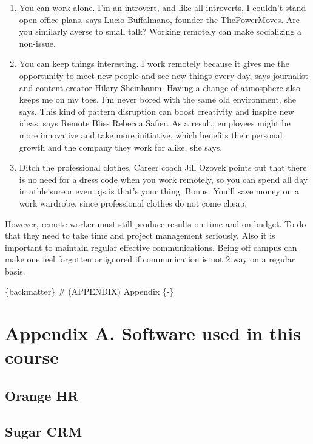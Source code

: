 \documentclass[]{book}
\begin{document}
\begin{enumerate}
\item
  You can work alone. I'm an introvert, and like all introverts, I couldn't stand open office plans, says Lucio Buffalmano, founder the ThePowerMoves. Are you similarly averse to small talk? Working remotely can make socializing a non-issue.
\item
  You can keep things interesting. I work remotely because it gives me the opportunity to meet new people and see new things every day, says journalist and content creator Hilary Sheinbaum. Having a change of atmosphere also keeps me on my toes. I'm never bored with the same old environment, she says. This kind of pattern disruption can boost creativity and inspire new ideas, says Remote Bliss Rebecca Safier. As a result, employees might be more innovative and take more initiative, which benefits their personal growth and the company they work for alike, she says.
\item
  Ditch the professional clothes.
  Career coach Jill Ozovek points out that there is no need for a dress code when you work remotely, so you can spend all day in athleisureor even pjs is that's your thing. Bonus: You'll save money on a work wardrobe, since professional clothes do not come cheap.
\end{enumerate}

However, remote worker must still produce results on time and on budget. To do that they need to take time and project management seriously. Also it is important to maintain regular effective communications. Being off campus can make one feel forgotten or ignored if communication is not 2 way on a regular basis.

\{backmatter\}
\# (APPENDIX) Appendix \{-\}

\hypertarget{appendix-a.-software-used-in-this-course}{%
\chapter{Appendix A. Software used in this course}\label{appendix-a.-software-used-in-this-course}}

\hypertarget{orange-hr}{%
\section{Orange HR}\label{orange-hr}}

\hypertarget{sugar-crm}{%
\section{Sugar CRM}\label{sugar-crm}}
\end{document}
